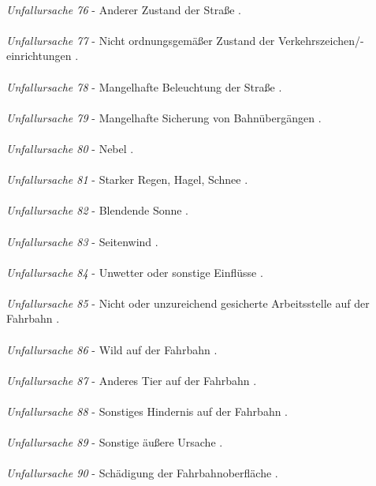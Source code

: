 \\
\textit{Unfallursache 76} - Anderer Zustand der Straße \parencite{PolizeiprasidiumOberbeyernSud.2016}.\\
\\
\textit{Unfallursache 77} - Nicht ordnungsgemäßer Zustand der Verkehrszeichen/-einrichtungen \parencite{PolizeiprasidiumOberbeyernSud.2016}.\\
\\
\textit{Unfallursache 78} - Mangelhafte Beleuchtung der Straße \parencite{PolizeiprasidiumOberbeyernSud.2016}.\\
\\
\textit{Unfallursache 79} - Mangelhafte Sicherung von Bahnübergängen \parencite{PolizeiprasidiumOberbeyernSud.2016}.\\
\\
\textit{Unfallursache 80} - Nebel \parencite{PolizeiprasidiumOberbeyernSud.2016}.\\
\\
\textit{Unfallursache 81} - Starker Regen, Hagel, Schnee \parencite{PolizeiprasidiumOberbeyernSud.2016}.\\
\\
\textit{Unfallursache 82} - Blendende Sonne \parencite{PolizeiprasidiumOberbeyernSud.2016}.\\
\\
\textit{Unfallursache 83} - Seitenwind \parencite{PolizeiprasidiumOberbeyernSud.2016}.\\
\\
\textit{Unfallursache 84} - Unwetter oder sonstige Einflüsse \parencite{PolizeiprasidiumOberbeyernSud.2016}.\\
\\
\textit{Unfallursache 85} - Nicht oder unzureichend gesicherte Arbeitsstelle auf der Fahrbahn \parencite{PolizeiprasidiumOberbeyernSud.2016}.\\
\\
\textit{Unfallursache 86} - Wild auf der Fahrbahn \parencite{PolizeiprasidiumOberbeyernSud.2016}.\\
\\
\textit{Unfallursache 87} - Anderes Tier auf der Fahrbahn \parencite{PolizeiprasidiumOberbeyernSud.2016}.\\
\\
\textit{Unfallursache 88} - Sonstiges Hindernis auf der Fahrbahn \parencite{PolizeiprasidiumOberbeyernSud.2016}.\\
\\
\textit{Unfallursache 89} - Sonstige äußere Ursache \parencite{PolizeiprasidiumOberbeyernSud.2016}.\\
\\
\textit{Unfallursache 90} - Schädigung der Fahrbahnoberfläche \parencite{PolizeiprasidiumOberbeyernSud.2016}.\\